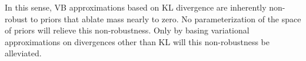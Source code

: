\FunctionDistFig{}

In this sense, VB approximations based on KL divergence are inherently
non-robust to priors that ablate mass nearly to zero.  No parameterization of
the space of priors will relieve this non-robustness.  Only by basing
variational approximations on divergences other than KL will this non-robustness
be alleviated.

